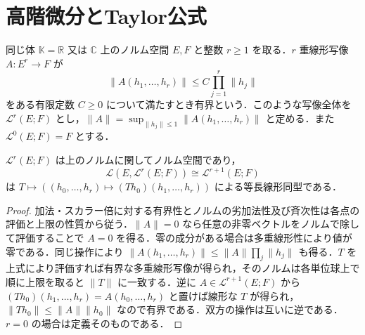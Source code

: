 \section{高階微分とTaylor公式}
\begin{defn}[有界多重線形写像のノルム]
同じ体 $\mathbb K=\mathbb R$ 又は $\mathbb C$ 上のノルム空間 $E,F$ と整数 $r\geq1$ を取る．$r$ 重線形写像 $A:E^r\to F$ が
\[
\|A(h_1,\ldots,h_r)\|\leq C\prod_{j=1}^r\|h_j\|
\]
をある有限定数 $C\geq0$ について満たすとき有界という．このような写像全体を $\mathcal L^r(E;F)$ とし，$\|A\|=\sup_{\|h_j\|\leq1}\|A(h_1,\ldots,h_r)\|$ と定める．また $\mathcal L^0(E;F)=F$ とする．
\end{defn}
\begin{prop}[多重線形写像と反復作用素空間]
$\mathcal L^r(E;F)$ は上のノルムに関してノルム空間であり，
\[
\mathcal L(E,\mathcal L^r(E;F))\cong\mathcal L^{r+1}(E;F)
\]
は $T\mapsto((h_0,\ldots,h_r)\mapsto(Th_0)(h_1,\ldots,h_r))$ による等長線形同型である．
\end{prop}
\begin{proof}
加法・スカラー倍に対する有界性とノルムの劣加法性及び斉次性は各点の評価と上限の性質から従う．$\|A\|=0$ なら任意の非零ベクトルをノルムで除して評価することで $A=0$ を得る．零の成分がある場合は多重線形性により値が零である．同じ操作により $\|A(h_1,\ldots,h_r)\|\leq\|A\|\prod_j\|h_j\|$ も得る．$T$ を上式により評価すれば有界な多重線形写像が得られ，そのノルムは各単位球上で順に上限を取ると $\|T\|$ に一致する．逆に $A\in\mathcal L^{r+1}(E;F)$ から $(Th_0)(h_1,\ldots,h_r)=A(h_0,\ldots,h_r)$ と置けば線形な $T$ が得られ，$\|Th_0\|\leq\|A\|\|h_0\|$ なので有界である．双方の操作は互いに逆である．$r=0$ の場合は定義そのものである．
\end{proof}
